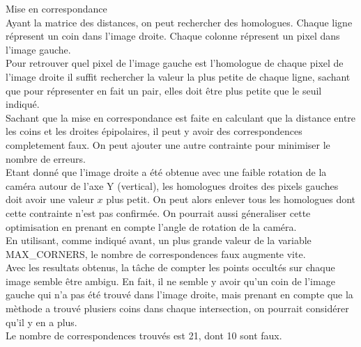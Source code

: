 \documentclass[a4paper,10pt]{article}
\begin{document}
\begin{paragraph}{Mise en correspondance}~ \\
Ayant la matrice des distances, on peut rechercher des homologues. Chaque ligne répresent un coin dans l'image droite. Chaque colonne répresent un pixel dans l'image gauche.
\\
Pour retrouver quel pixel de l'image gauche est l'homologue de chaque pixel de l'image droite il suffit rechercher la valeur la plus petite de chaque ligne, sachant que pour répresenter en fait un pair, elles doit être plus petite que le seuil indiqué.
\\
Sachant que la mise en correspondance est faite en calculant que la distance entre les coins et les droites épipolaires, il peut y avoir des correspondences completement faux. On peut ajouter une autre contrainte pour minimiser le nombre de erreurs. 
\\Etant donné que l'image droite a été obtenue avec une faible rotation de la caméra autour de l'axe Y (vertical), les homologues droites des pixels gauches doit avoir une valeur $x$ plus petit. On peut alors enlever tous les homologues dont cette contrainte n'est pas confirmée. On pourrait aussi géneraliser cette optimisation en prenant en compte l'angle de rotation de la caméra. 
\\
En utilisant, comme indiqué avant, un plus grande valeur de la variable MAX\_CORNERS, le nombre de correspondences faux augmente vite.
\\
Avec les resultats obtenus, la tâche de compter les points occultés sur chaque image semble être ambigu. En fait, il ne semble y avoir qu'un coin de l'image gauche qui n'a pas été trouvé dans l'image droite, mais prenant en compte que la mèthode a trouvé plusiers coins dans chaque intersection, on pourrait considérer qu'il y en a plus.
\\
Le nombre de correspondences trouvés est 21, dont 10 sont faux.
\end{paragraph}
\end{document}
